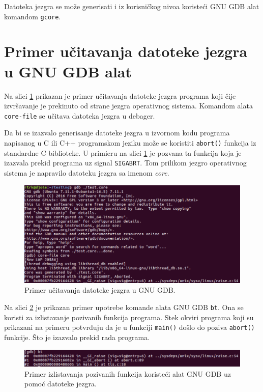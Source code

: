 \documentclass[12pt,oneside]{memoir}
\begin{document}
Datoteka jezgra se može generisati i iz korisničkog nivoa koristeći GNU GDB alat komandom \texttt{gcore}.

\section{Primer učitavanja datoteke jezgra u GNU GDB alat}

Na slici \ref{fig:ucitavanje_core} prikazan je primer učitavanja datoteke jezgra programa koji čije izvršavanje je prekinuto od strane jezgra operativnog sistema. Komandom alata \texttt{core-file} se učitava datoteka jezgra u debager.

Da bi se izazvalo generisanje datoteke jezgra u izvornom kodu programa napisanog u C ili C++ programskom jeziku može se koristiti \texttt{abort()} funkcija iz standardne C biblioteke. U primieru na slici \ref{fig:ucitavanje_core} je pozvana ta funkcija koja je izazvala prekid programa uz signal \texttt{SIGABRT}. Tom prilikom jezgro operativnog sistema je napravilo datoteku jezgra sa imenom \emph{core}.

\newpage
\begin{figure}[h!]
	\begin{center}
		\includegraphics[scale=0.6]{slike/ucitanje_core.png}
	\end{center}
	\caption{Primer učitavanja datoteke jezgra u GNU GDB.}
	\label{fig:ucitavanje_core}
\end{figure}

Na slici \ref{fig:bt_core} je prikazan primer upotrebe komande alata GNU GDB \texttt{bt}. Ona se koristi za izlistavanje pozivanih funkcija programa. Stek okviri programa koji su prikazani na primeru potvrđuju da je u funkciji \texttt{main()} došlo do poziva \texttt{abort()} funkcije. Što je izazvalo prekid rada programa.

\begin{figure}[h!]
	\begin{center}
		\includegraphics[scale=0.6]{slike/bt_core.png}
	\end{center}
	\caption{Primer izlistavanja pozivanih funkcija koristeći alat GNU GDB uz pomoć datoteke jezgra.}
	\label{fig:bt_core}
\end{figure}
\end{document}
